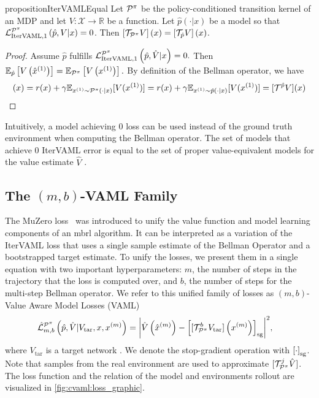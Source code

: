 \begin{restatable}{proposition}{IterVAMLEqual}{\textcite{itervaml}}\label{prop:cvaml:1_1}
    Let $\P^\pi$ be the policy-conditioned transition kernel of an MDP and let $V: \mathcal{X} \rightarrow \mathbb{R}$ be a function.
    Let $\hat{p}(\cdot|x)$ be a model so that ${\mathcal{L}}^{\P^\pi}_{\mathrm{IterVAML}, 1}\left(\hat{p},V|x\right) = 0$.
    Then $\squareb{\mathcal{T}_{\P^\pi} V }(x) = \squareb{\mathcal{T}_{\hat{p}} V }(x)$.
\end{restatable}
\begin{proof}
    Assume $\hat{p}$ fulfills ${\mathcal{L}}^{\P^\pi}_{\mathrm{IterVAML}, 1}\left(\hat{p},\hat{V}|x\right) = 0.$ Then $\mathbb{E}_{\hat{p}}\left[V\left(\hat{x}^{(1)}\right)\right] = \mathbb{E}_{\P^\pi}\left[V\left(x^{(1)}\right)\right].$ By definition of the Bellman operator, we have
    \begin{align}
        [\mathcal{T}^{\P^\pi} V](x) = r(x) + \gamma \mathbb{E}_{x^{(1)}\sim \P^\pi(\cdot|x)}[V(x^{(1)})] = r(x) + \gamma \mathbb{E}_{x^{(1)}\sim \hat{p}(\cdot|x)}[V(x^{(1)})] = [\mathcal{T}^{\hat{p}}V](x)
    \end{align}
\end{proof}

Intuitively, a model achieving $0$ loss can be used instead of the ground truth environment when computing the Bellman operator.
The set of models that achieve $0$ IterVAML error is equal to the set of proper value-equivalent models for the value estimate $\hat{V}$ \cite{grimm2021proper}.

\subsection{The $(m,b)$-VAML Family}
The MuZero loss~\parencite{schrittwieser2020mastering} was introduced to unify the value function and model learning components of an \ac{mbrl} algorithm.
It can be interpreted as a variation of the IterVAML loss that uses a single sample estimate of the Bellman Operator and a bootstrapped target estimate. 
To unify the losses, we present them in a single equation with two important hyperparameters: $m$, the number of steps in the trajectory that the loss is computed over, and $b$, the number of steps for the multi-step Bellman operator.
We refer to this unified family of losses as $(m,b)$-Value Aware Model Losses (VAML)
\begin{align}
    & \hat{\mathcal{L}}^{\P^\pi}_{m,b}\left(\hat{p},\hat{V}|V_\mathrm{tar},x, x^{(m)}\right) = \biggl|\hat{V}\roundb{\hat{x}^{(m)}} - 
    \squareb{[\mathcal{T}_{\P^\pi}^b V_\mathrm{tar}]\roundb{x^{(m)}}}_\mathrm{sg}\biggr|^2, \label{eq:cvaml:dal_loss}
\end{align}
%
where $V_\mathrm{tar}$ is a target network \parencite{mnih2013playing}.
We denote the stop-gradient operation with $\squareb{\cdot}_\mathrm{sg}$.
Note that samples from the real environment are used to approximate $[\mathcal{T}_{\P^\pi}^j \hat{V}]$.
The loss function and the relation of the model and environments rollout are visualized in \autoref{fig:cvaml:loss_graphic}.

